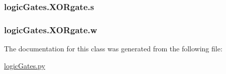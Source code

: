 \subsubsection[{s}]{\setlength{\rightskip}{0pt plus 5cm}logic\+Gates.\+X\+O\+Rgate.\+s}\label{classlogic_gates_1_1_x_o_rgate_ad91478c42fd771f96c756c5b054f2d95}
\hypertarget{classlogic_gates_1_1_x_o_rgate_a7ac5f8b1e7b12b1f99256f1def471f7d}{}
\subsubsection[{w}]{\setlength{\rightskip}{0pt plus 5cm}logic\+Gates.\+X\+O\+Rgate.\+w}\label{classlogic_gates_1_1_x_o_rgate_a7ac5f8b1e7b12b1f99256f1def471f7d}


The documentation for this class was generated from the following file\+:\begin{DoxyCompactItemize}
\item 
\hyperlink{logic_gates_8py}{logic\+Gates.\+py}\end{DoxyCompactItemize}
